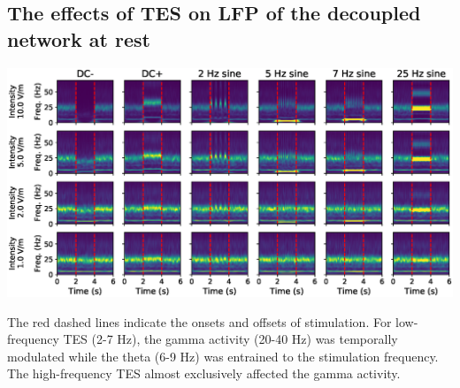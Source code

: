 \documentclass[a0,portrait]{a0poster}
\newenvironment{Figure}
  {\par\medskip\noindent\minipage{\linewidth}}
  {\endminipage\par\medskip}
\begin{document}
\begin{multicols*}{2}
\subsection*{The effects of TES on LFP of the decoupled network at rest}
\begin{Figure}
\centering
\includegraphics[width=\linewidth,keepaspectratio]{SimpleStim.eps}
\end{Figure}
\begin{flushleft}
\normalsize
The red dashed lines indicate the onsets and offsets of stimulation. For low-frequency TES (2-7 Hz), the gamma activity (20-40 Hz) was temporally modulated while the theta (6-9 Hz) was entrained to the stimulation frequency. The high-frequency TES almost exclusively affected the gamma activity.
\end{flushleft}

\end{multicols*}
\end{document}
